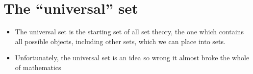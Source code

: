 \chapter{The ``universal'' set}
\label{universal}

\begin{itemize}
\item
The universal set is the starting set of all set theory, the one which contains all possible objects, including other sets, which we can place into sets.
\item
Unfortunately, the universal set is an idea so wrong it almost broke the whole of mathematics

\end{itemize}
